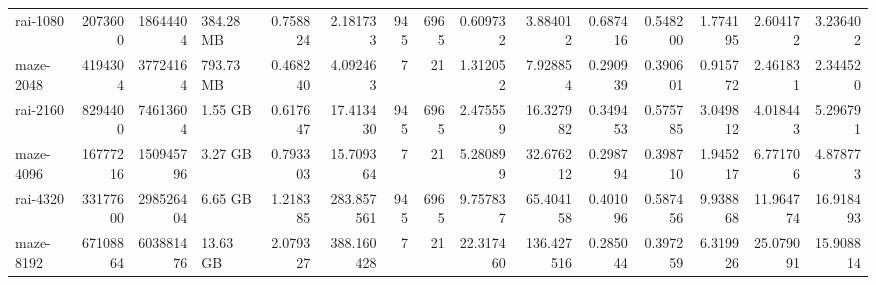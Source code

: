 \begin{tabular}{lrrlrrrrrrrrrrr}
rai-1080  &    2073600 &    18644404 &  384.28 MB &      0.758824 &    2.181733 &       945 &           6965 &        0.609732 &    3.884012 &       0.687416 &         0.548200 &          1.774195 &    2.604172 &   3.236402 \\
maze-2048 &    4194304 &    37724164 &  793.73 MB &      0.468240 &    4.092463 &         7 &             21 &        1.312052 &    7.928854 &       0.290939 &         0.390601 &          0.915772 &    2.461831 &   2.344520 \\
rai-2160  &    8294400 &    74613604 &    1.55 GB &      0.617647 &   17.413430 &       945 &           6965 &        2.475559 &   16.327982 &       0.349453 &         0.575785 &          3.049812 &    4.018443 &   5.296791 \\
maze-4096 &   16777216 &   150945796 &    3.27 GB &      0.793303 &   15.709364 &         7 &             21 &        5.280899 &   32.676212 &       0.298794 &         0.398710 &          1.945217 &    6.771706 &   4.878773 \\
rai-4320  &   33177600 &   298526404 &    6.65 GB &      1.218385 &  283.857561 &       945 &           6965 &        9.757837 &   65.404158 &       0.401096 &         0.587456 &          9.938868 &   11.964774 &  16.918493 \\
maze-8192 &   67108864 &   603881476 &   13.63 GB &      2.079327 &  388.160428 &         7 &             21 &       22.317460 &  136.427516 &       0.285044 &         0.397259 &          6.319926 &   25.079091 &  15.908814 \\
\bottomrule
\end{tabular}
